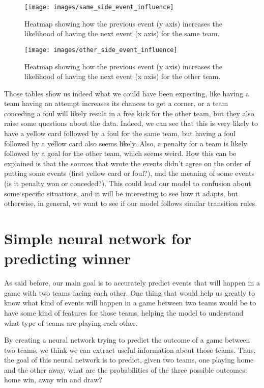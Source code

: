 \documentclass[10pt,conference,onecolumn]{IEEEtran}
\begin{document}
\begin{figure}[H]
\centering
\texttt{[image: images/same\_side\_event\_influence]}
\caption{Heatmap showing how the previous event (y axis) increases the likelihood of having the next event (x axis) for the same team.}
\label{fig:same_side_event_influence}
\end{figure}

\begin{figure}[H]
\centering
\texttt{[image: images/other\_side\_event\_influence]}
\caption{Heatmap showing how the previous event (y axis) increases the likelihood of having the next event (x axis) for the other team.}
\label{fig:other_side_event_influence}
\end{figure}

Those tables show us indeed what we could have been expecting, like having a team having an attempt increases its chances to get a corner, or a team conceding a foul will likely result in a free kick for the other team, but they also raise some questions about the data. Indeed, we can see that this is very likely to have a yellow card followed by a foul for the same team, but having a foul followed by a yellow card also seems likely. Also, a penalty for a team is likely followed by a goal for the other team, which seems weird. How this can be explained is that the sources that wrote the events didn't agree on the order of putting some events (first yellow card or foul?), and the meaning of some events (is it penalty won or conceded?). This could lead our model to confusion about some specific situations, and it will be interesting to see how it adapts, but otherwise, in general, we want to see if our model follows similar transition rules.

\section{Simple neural network for predicting winner} \label{sec:simple_nn}
As said before, our main goal is to accurately predict events that will happen in a game with two teams facing each other. One thing that would help us greatly to know what kind of events will happen in a game between two teams would be to have some kind of features for those teams, helping the model to understand what type of teams are playing each other.

By creating a neural network trying to predict the outcome of a game between two teams, we think we can extract useful information about those teams. Thus, the goal of this neural network is to predict, given two teams, one playing home and the other away, what are the probabilities of the three possible outcomes: home win, away win and draw?
\end{document}
